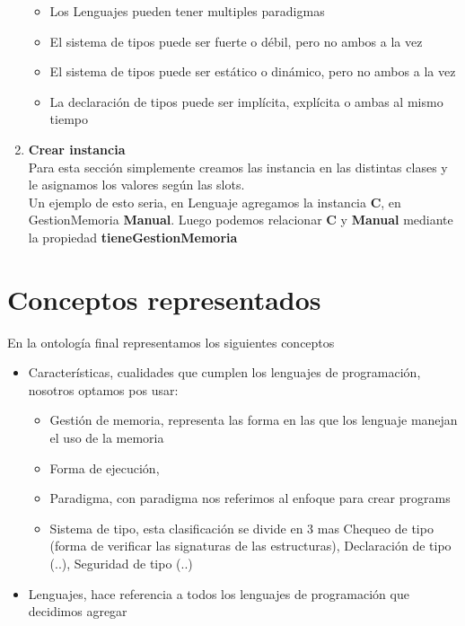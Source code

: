 \documentclass[12pt, titlepage, a4paper]{article}
\begin{document}
\begin{enumerate}
{\begin{itemize}
            \item {Los Lenguajes pueden tener multiples paradigmas}
            \item {El sistema de tipos puede ser fuerte o débil, pero no 
                ambos a la vez}
            \item {El sistema de tipos puede ser estático o dinámico, pero no
                ambos a la vez}
            \item {La declaración de tipos puede ser implícita, explícita o ambas al mismo tiempo}
          \end{itemize}
          }
    \item {\textbf{Crear instancia}\\
         Para esta sección simplemente creamos las instancia en las 
         distintas clases y le asignamos los valores según las slots.\\ 
         Un ejemplo de esto seria, en Lenguaje agregamos la 
         instancia \textbf{C}, en GestionMemoria \textbf{Manual}. 
         Luego podemos relacionar \textbf{C} y \textbf{Manual} mediante la 
         propiedad \textbf{tieneGestionMemoria}}
\end{enumerate}

\section{Conceptos representados}
En la ontología final representamos los siguientes conceptos
\begin{itemize}
    \item {Características, cualidades que cumplen los lenguajes de programación, 
        nosotros optamos pos usar:
        \begin{itemize}
            \item {Gestión de memoria, representa las forma en las que los 
                lenguaje manejan el uso de la memoria}
            \item {Forma de ejecución, }
            \item {Paradigma, con paradigma nos referimos al
                enfoque para crear programs}
            \item {Sistema de tipo, esta clasificación se divide en 3 mas
                Chequeo de tipo (forma de verificar las signaturas de las 
                estructuras), Declaración de tipo (..), Seguridad de tipo 
                (..)}
        \end{itemize}}
    \item {Lenguajes, hace referencia a todos los lenguajes de programación 
        que decidimos agregar}
\end{itemize}
\end{document}

